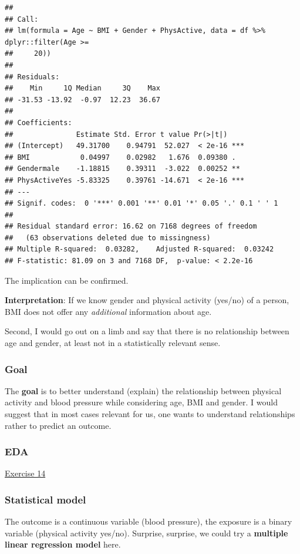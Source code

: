 \documentclass[
]{book}
\begin{document}
\begin{verbatim}
## 
## Call:
## lm(formula = Age ~ BMI + Gender + PhysActive, data = df %>% dplyr::filter(Age >= 
##     20))
## 
## Residuals:
##    Min     1Q Median     3Q    Max 
## -31.53 -13.92  -0.97  12.23  36.67 
## 
## Coefficients:
##               Estimate Std. Error t value Pr(>|t|)    
## (Intercept)   49.31700    0.94791  52.027  < 2e-16 ***
## BMI            0.04997    0.02982   1.676  0.09380 .  
## Gendermale    -1.18815    0.39311  -3.022  0.00252 ** 
## PhysActiveYes -5.83325    0.39761 -14.671  < 2e-16 ***
## ---
## Signif. codes:  0 '***' 0.001 '**' 0.01 '*' 0.05 '.' 0.1 ' ' 1
## 
## Residual standard error: 16.62 on 7168 degrees of freedom
##   (63 observations deleted due to missingness)
## Multiple R-squared:  0.03282,    Adjusted R-squared:  0.03242 
## F-statistic: 81.09 on 3 and 7168 DF,  p-value: < 2.2e-16
\end{verbatim}

The implication can be confirmed.

\textbf{Interpretation}: If we know gender and physical activity (yes/no) of a person,
BMI does not offer any \emph{additional} information about age.

Second, I would go out on a limb and say that there is no relationship
between age and gender, at least not in a statistically relevant sense.

\subsubsection{Goal}\label{goal}

The \textbf{goal} is to better understand (explain) the relationship between
physical activity and blood pressure while considering age, BMI and gender.
I would suggest that in most cases relevant for us, one wants to understand
relationships rather to predict an outcome.

\subsubsection{EDA}\label{eda}

\hyperref[exercise14_multiple_regression]{Exercise 14}

\subsubsection{Statistical model}\label{statistical-model}

The outcome is a continuous variable (blood pressure), the exposure is a binary
variable (physical activity yes/no).
Surprise, surprise, we could try a \textbf{multiple linear regression model} here.
\end{document}
